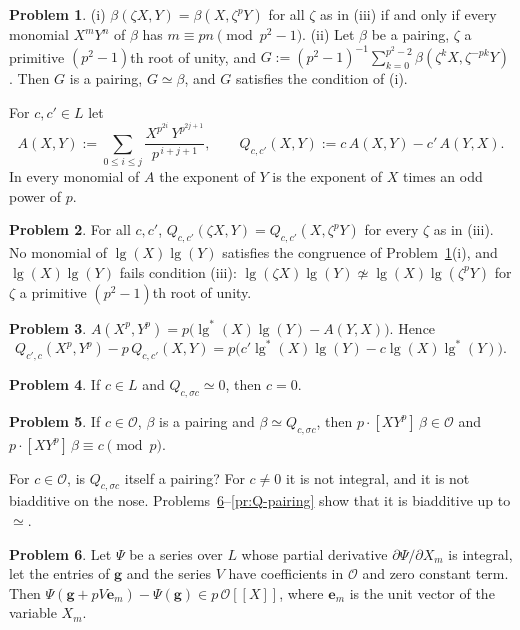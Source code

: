\documentclass[reqno]{amsart}
\theoremstyle{definition}
\newtheorem{problem}{Problem}[section]
\theoremstyle{plain}
\newcommand{\Oc}{\mathcal{O}}
\newcommand{\lgg}{\operatorname{lg}}
\begin{document}
\begin{problem}\label{pr:average}
(i) \(\beta(\zeta X, Y) = \beta(X, \zeta^p Y)\) for all \(\zeta\) as in (iii) if and only if every monomial \(X^m Y^n\) of \(\beta\) has \(m \equiv pn \pmod{p^2-1}\).
(ii) Let \(\beta\) be a pairing, \(\zeta\) a primitive \((p^2-1)\)th root of unity, and \(G := (p^2-1)^{-1}\sum_{k=0}^{p^2-2} \beta(\zeta^k X, \zeta^{-pk} Y)\).  Then \(G\) is a pairing, \(G \simeq \beta\), and \(G\) satisfies the condition of (i).
\end{problem}

For \(c, c' \in L\) let
\[
  A(X,Y) := \sum_{0 \le i \le j} \frac{X^{p^{2i}}\, Y^{p^{2j+1}}}{p^{\,i+j+1}},
  \qquad
  Q_{c,c'}(X,Y) := c\,A(X,Y) - c'\,A(Y,X) .
\]
In every monomial of \(A\) the exponent of \(Y\) is the exponent of \(X\) times an odd power of \(p\).

\begin{problem}\label{pr:Q-semilinear}
For all \(c, c'\), \(Q_{c,c'}(\zeta X, Y) = Q_{c,c'}(X, \zeta^p Y)\) for every \(\zeta\) as in (iii).  No monomial of \(\lgg(X)\lgg(Y)\) satisfies the congruence of Problem~\ref{pr:average}(i), and \(\lgg(X)\lgg(Y)\) fails condition (iii): \(\lgg(\zeta X)\lgg(Y) \not\simeq \lgg(X)\lgg(\zeta^p Y)\) for \(\zeta\) a primitive \((p^2-1)\)th root of unity.
\end{problem}

\begin{problem}\label{pr:reindex}
\(A(X^p, Y^p) = p\bigl(\lgg^*(X)\lgg(Y) - A(Y,X)\bigr)\).  Hence
\[
  Q_{c',c}(X^p, Y^p) - p\,Q_{c,c'}(X,Y) = p\bigl(c'\lgg^*(X)\lgg(Y) - c\lgg(X)\lgg^*(Y)\bigr).
\]
\end{problem}

\begin{problem}\label{pr:unique}
If \(c \in L\) and \(Q_{c,\sigma c} \simeq 0\), then \(c = 0\).
\end{problem}

\begin{problem}\label{pr:c-residue}
If \(c \in \Oc\), \(\beta\) is a pairing and \(\beta \simeq Q_{c,\sigma c}\), then \(p \cdot [X Y^p]\,\beta \in \Oc\) and \(p \cdot [XY^p]\,\beta \equiv c \pmod p\).
\end{problem}

For \(c \in \Oc\), is \(Q_{c,\sigma c}\) itself a pairing?  For \(c \ne 0\) it is not integral, and it is not biadditive on the nose.  Problems~\ref{pr:taylor}--\ref{pr:Q-pairing} show that it is biadditive up to \(\simeq\).

\begin{problem}\label{pr:taylor}
Let \(\Psi\) be a series over \(L\) whose partial derivative \(\partial\Psi/\partial X_m\) is integral, let the entries of \(\mathbf{g}\) and the series \(V\) have coefficients in \(\Oc\) and zero constant term.  Then \(\Psi(\mathbf{g} + pV\mathbf{e}_m) - \Psi(\mathbf{g}) \in p\,\Oc[[X]]\), where \(\mathbf{e}_m\) is the unit vector of the variable \(X_m\).
\end{problem}
\end{document}
